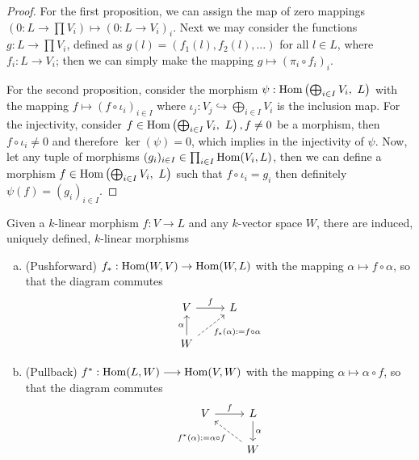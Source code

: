 \begin{proof}
  For the first proposition, we can assign the map of zero mappings \((0 : L \to
  \prod V_i) \longmapsto (0 : L \to V_i)_i\). Next we may consider the functions
  \(g : L \to \prod V_i\), defined as \(g(l) = (f_1(l), f_2(l), \dots)\) for all
  \(l \in L\), where \(f_i : L \to V_i\); then we can simply make the mapping
  \(g \longmapsto (\pi_i \circ f_i)_i\).

  For the second proposition, consider the morphism \(\psi : \operatorname{Hom}\left(
  \bigoplus_{i \in I} V_i,\ L \right) \) with the mapping \(f \mapsto (f \circ
  \iota_i)_{i \in I}\) where \(\iota_j: V_j \hookrightarrow \bigoplus_{i \in
  I} V_i\) is the inclusion map. For the injectivity, consider \(f \in
  \operatorname{Hom}\left( \bigoplus_{i \in I} V_i,\ L \right), f \neq 0\) be a morphism,
  then \(f \circ \iota_i \neq 0\) and therefore \(\ker(\psi) = 0\), which
  implies in the injectivity of \(\psi\). Now, let any tuple of morphisms
  \((g_i)_{i \in I} \in \prod_{i \in I} \operatorname{Hom}(V_i, L)\), then we can define a
  morphism \(f \in \operatorname{Hom}\left( \bigoplus_{i \in I} V_i,\ L \right)\) such that
  \(f \circ \iota_i = g_i\) then definitely \(\psi(f) = (g_i)_{i \in I}\).
\end{proof}

\begin{definition}
  Given a \(k\)-linear morphism \(f : V \to L\) and any \(k\)-vector space
  \(W\), there are induced, uniquely defined, \(k\)-linear morphisms
  \begin{enumerate}[(a)]
    \item (Pushforward) \(f_\ast : \operatorname{Hom}(W, V) \to \operatorname{Hom}(W, L)\) with the mapping
      \(\alpha \mapsto f \circ \alpha\), so that the diagram commutes
      \[
        \begin{tikzcd}
          V \ar[r, "f"]
            &L \\
          W \ar[u, "\alpha"] 
          \ar[ur, dashed, swap, "f_\ast(\alpha) := f \circ \alpha"]
        \end{tikzcd}
      \] 
    \item (Pullback) \(f^\ast : \operatorname{Hom}(L, W) \longrightarrow \operatorname{Hom}(V, W)\) with
      the mapping \(\alpha \longmapsto \alpha \circ f\), so that the diagram
      commutes
      \[
        \begin{tikzcd}
          V \ar[r, "f"] 
            &L \ar[d, "\alpha"] \\
            &W \ar[ul, dashed, "f^\ast(\alpha) := \alpha \circ f"]
        \end{tikzcd}
      \] 
  \end{enumerate}
\end{definition}

